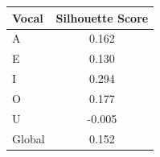\begin{tabular}{lc}
\toprule
\rowcolor{col01}
Vocal & Silhouette Score \\
\midrule
A & 0.162 \\
E & 0.130 \\
I & 0.294 \\
O & 0.177 \\
U & -0.005 \\
Global & 0.152 \\
\bottomrule
\end{tabular}
